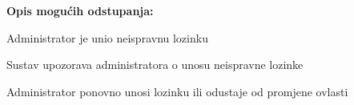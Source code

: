 \begin{packed_item}
					\item  \textbf{Opis mogućih odstupanja:}
					
					\item[] \begin{packed_item}
						
						\item[10.a] Administrator je unio neispravnu lozinku
						\item[] \begin{packed_enum}
							\item Sustav upozorava administratora o unosu neispravne lozinke 
							\item Administrator ponovno unosi lozinku ili odustaje od promjene ovlasti						
						\end{packed_enum}
				\end{packed_item}
			\end{packed_item}
				
